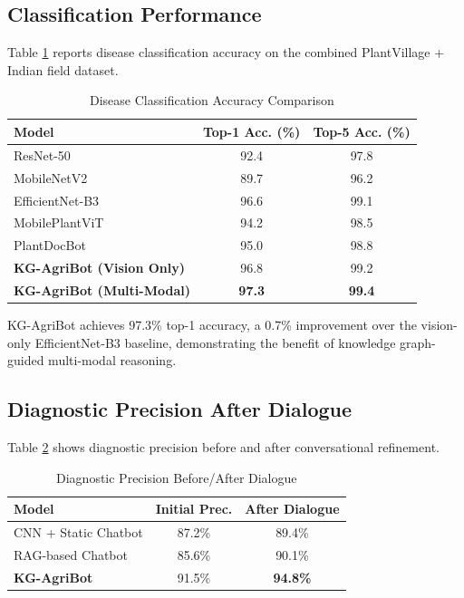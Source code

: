 \documentclass[conference]{IEEEtran}
\begin{document}
\subsection{Classification Performance}

Table \ref{tab:classification} reports disease classification accuracy on the combined PlantVillage + Indian field dataset.

\begin{table}[htbp]
\caption{Disease Classification Accuracy Comparison}
\label{tab:classification}
\centering
\begin{tabular}{lcc}
\toprule
\textbf{Model} & \textbf{Top-1 Acc. (\%)} & \textbf{Top-5 Acc. (\%)} \\
\midrule
ResNet-50 \cite{resnet} & 92.4 & 97.8 \\
MobileNetV2 \cite{mobilenet} & 89.7 & 96.2 \\
EfficientNet-B3 \cite{efficientnet} & 96.6 & 99.1 \\
MobilePlantViT \cite{mobileplantvit} & 94.2 & 98.5 \\
PlantDocBot \cite{plantdocbot} & 95.0 & 98.8 \\
\midrule
\textbf{KG-AgriBot (Vision Only)} & 96.8 & 99.2 \\
\textbf{KG-AgriBot (Multi-Modal)} & \textbf{97.3} & \textbf{99.4} \\
\bottomrule
\end{tabular}
\end{table}

KG-AgriBot achieves 97.3\% top-1 accuracy, a 0.7\% improvement over the vision-only EfficientNet-B3 baseline, demonstrating the benefit of knowledge graph-guided multi-modal reasoning.

\subsection{Diagnostic Precision After Dialogue}

Table \ref{tab:dialogue} shows diagnostic precision before and after conversational refinement.

\begin{table}[htbp]
\caption{Diagnostic Precision Before/After Dialogue}
\label{tab:dialogue}
\centering
\begin{tabular}{lcc}
\toprule
\textbf{Model} & \textbf{Initial Prec.} & \textbf{After Dialogue} \\
\midrule
CNN + Static Chatbot & 87.2\% & 89.4\% \\
RAG-based Chatbot & 85.6\% & 90.1\% \\
\textbf{KG-AgriBot} & 91.5\% & \textbf{94.8\%} \\
\bottomrule
\end{tabular}
\end{table}
\end{document}
